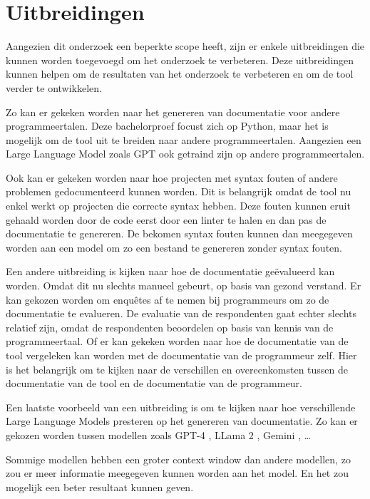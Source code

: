 
\chapter{Uitbreidingen}
\label{ch:uitbreidingen}

Aangezien dit onderzoek een beperkte scope heeft, zijn er enkele uitbreidingen die kunnen worden toegevoegd om het onderzoek te verbeteren.
Deze uitbreidingen kunnen helpen om de resultaten van het onderzoek te verbeteren en om de tool verder te ontwikkelen.

Zo kan er gekeken worden naar het genereren van documentatie voor andere programmeertalen.
Deze bachelorproef focust zich op Python, maar het is mogelijk om de tool uit te breiden naar andere programmeertalen.
Aangezien een Large Language Model zoals GPT \autocite{OpenAi} ook getraind zijn op andere programmeertalen.

Ook kan er gekeken worden naar hoe projecten met syntax fouten of andere problemen gedocumenteerd kunnen worden.
Dit is belangrijk omdat de tool nu enkel werkt op projecten die correcte syntax hebben.
Deze fouten kunnen eruit gehaald worden door de code eerst door een linter te halen en dan pas de documentatie te genereren.
De bekomen syntax fouten kunnen dan meegegeven worden aan een model om zo een bestand te genereren zonder syntax fouten.

Een andere uitbreiding is kijken naar hoe de documentatie geëvalueerd kan worden.
Omdat dit nu slechts manueel gebeurt, op basis van gezond verstand. 
Er kan gekozen worden om enquêtes af te nemen bij programmeurs om zo de documentatie te evalueren.
De evaluatie van de respondenten gaat echter slechts relatief zijn, omdat de respondenten beoordelen op basis van kennis van de programmeertaal. 
Of er kan gekeken worden naar hoe de documentatie van de tool vergeleken kan worden met de documentatie van de programmeur zelf.
Hier is het belangrijk om te kijken naar de verschillen en overeenkomsten tussen de documentatie van de tool en de documentatie van de programmeur.

Een laatste voorbeeld van een uitbreiding is om te kijken naar hoe verschillende Large Language Models presteren op het genereren van documentatie.
Zo kan er gekozen worden tussen modellen zoals GPT-4 \autocite{OpenAI2023}, LLama 2 \autocite{Meta2024}, Gemini \autocite{Google2024}, \dots

Sommige modellen hebben een groter context window dan andere modellen, zo zou er meer informatie meegegeven kunnen worden aan het model.
En het zou mogelijk een beter resultaat kunnen geven.
